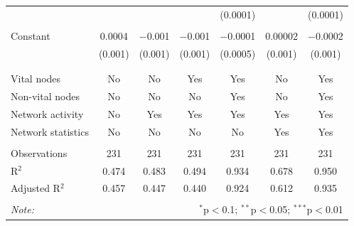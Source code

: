 \begin{table}[!htbp]
\begin{tabular}{@{\extracolsep{5pt}}lcccccc}
  &  &  &  & (0.0001) &  & (0.0001) \\ 
  & & & & & & \\ 
 Constant & 0.0004 & $-$0.001 & $-$0.001 & $-$0.0001 & 0.00002 & $-$0.0002 \\ 
  & (0.001) & (0.001) & (0.001) & (0.0005) & (0.001) & (0.001) \\ 
  & & & & & & \\ 
\hline \\[-1.8ex] 
Vital nodes & No & No & Yes & Yes & No & Yes \\ 
Non-vital nodes & No & No & No & Yes & No & Yes \\ 
Network activity & No & Yes & Yes & Yes & Yes & Yes \\ 
Network statistics & No & No & No & No & Yes & Yes \\ 
\hline &  &  &  &  &  &  \\ 
Observations & 231 & 231 & 231 & 231 & 231 & 231 \\ 
R$^{2}$ & 0.474 & 0.483 & 0.494 & 0.934 & 0.678 & 0.950 \\ 
Adjusted R$^{2}$ & 0.457 & 0.447 & 0.440 & 0.924 & 0.612 & 0.935 \\ 
\hline 
\hline \\[-1.8ex] 
\textit{Note:}  & \multicolumn{6}{r}{$^{*}$p$<$0.1; $^{**}$p$<$0.05; $^{***}$p$<$0.01} \\ 
\end{tabular} 
\end{table} 
